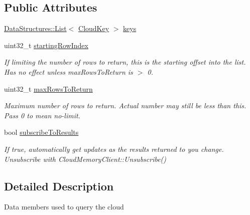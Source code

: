 \subsection*{Public Attributes}
\begin{DoxyCompactItemize}
\item 
\hyperlink{class_data_structures_1_1_list}{Data\-Structures\-::\-List}$<$ \hyperlink{struct_rak_net_1_1_cloud_key}{Cloud\-Key} $>$ \hyperlink{struct_rak_net_1_1_cloud_query_a3a01154505b9a605142a8c95235d75ea}{keys}
\item 
\hypertarget{struct_rak_net_1_1_cloud_query_ae31a898074fcfc16a03ba8b9c20be242}{uint32\-\_\-t \hyperlink{struct_rak_net_1_1_cloud_query_ae31a898074fcfc16a03ba8b9c20be242}{starting\-Row\-Index}}\label{struct_rak_net_1_1_cloud_query_ae31a898074fcfc16a03ba8b9c20be242}

\begin{DoxyCompactList}\small\item\em If limiting the number of rows to return, this is the starting offset into the list. Has no effect unless max\-Rows\-To\-Return is $>$ 0. \end{DoxyCompactList}\item 
\hypertarget{struct_rak_net_1_1_cloud_query_a6810e00768754e88ae1825c6eea6b265}{uint32\-\_\-t \hyperlink{struct_rak_net_1_1_cloud_query_a6810e00768754e88ae1825c6eea6b265}{max\-Rows\-To\-Return}}\label{struct_rak_net_1_1_cloud_query_a6810e00768754e88ae1825c6eea6b265}

\begin{DoxyCompactList}\small\item\em Maximum number of rows to return. Actual number may still be less than this. Pass 0 to mean no-\/limit. \end{DoxyCompactList}\item 
\hypertarget{struct_rak_net_1_1_cloud_query_a7c8c441b2801141bbba54946cc9ee4f7}{bool \hyperlink{struct_rak_net_1_1_cloud_query_a7c8c441b2801141bbba54946cc9ee4f7}{subscribe\-To\-Results}}\label{struct_rak_net_1_1_cloud_query_a7c8c441b2801141bbba54946cc9ee4f7}

\begin{DoxyCompactList}\small\item\em If true, automatically get updates as the results returned to you change. Unsubscribe with Cloud\-Memory\-Client\-::\-Unsubscribe() \end{DoxyCompactList}\end{DoxyCompactItemize}


\subsection{Detailed Description}
Data members used to query the cloud 

